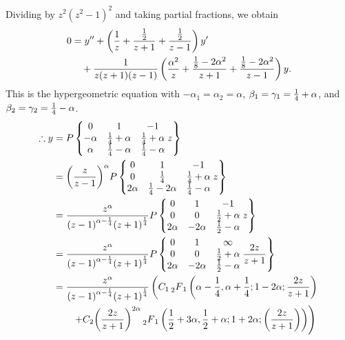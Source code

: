 \item

Dividing by $z^2 {\left( z^2 - 1 \right)}^2$ and taking partial fractions, we obtain
\begin{align*}
    0
    &= y'' + \left(
        \frac{1}{z} + \frac{\frac{1}{2}}{z + 1} + \frac{\frac{1}{2}}{z - 1}
    \right) y' \\
    &\quad + \frac{1}{z (z + 1) (z - 1)} \left(
        \frac{\alpha^2}{z}
        + \frac{\frac{1}{8} - 2\alpha^2}{z + 1}
        + \frac{\frac{1}{8} - 2\alpha^2}{z - 1}
    \right) y.
\end{align*}
This is the hypergeometric equation with $-\alpha_1 = \alpha_2 = \alpha$,
$\beta_1 = \gamma_1 = \frac{1}{4} + \alpha$,
and $\beta_2 = \gamma_2 = \frac{1}{4} - \alpha$.
\begin{align*}
    \therefore y
    &= P\left\{
        \begin{matrix} 0 & 1 & -1 \\ -\alpha & \frac{1}{4} + \alpha & \frac{1}{4} + \alpha \\ \alpha & \frac{1}{4} - \alpha & \frac{1}{4} - \alpha \end{matrix}
    \; z\right\} \\
    &= {\left( \frac{z}{z - 1} \right)}^\alpha P\left\{
        \begin{matrix} 0 & 1 & -1 \\ 0 & \frac{1}{4} & \frac{1}{4} + \alpha \\ 2\alpha & \frac{1}{4} - 2\alpha & \frac{1}{4} - \alpha \end{matrix}
    \; z\right\} \\
    &= \frac{z^\alpha}{{(z - 1)}^{\alpha - \frac{1}{4}} {(z + 1)}^{\frac{1}{4}}} P\left\{
        \begin{matrix} 0 & 1 & -1 \\ 0 & 0 & \frac{1}{2} + \alpha \\ 2\alpha & -2\alpha & \frac{1}{2} - \alpha \end{matrix}
    \; z\right\} \\
    &= \frac{z^\alpha}{{(z - 1)}^{\alpha - \frac{1}{4}} {(z + 1)}^{\frac{1}{4}}} P\left\{
        \begin{matrix} 0 & 1 & \infty \\ 0 & 0 & \frac{1}{2} + \alpha \\ 2\alpha & -2\alpha & \frac{1}{2} - \alpha \end{matrix}
    \; \frac{2z}{z + 1}\right\} \\
    &= \frac{z^\alpha}{{(z - 1)}^{\alpha - \frac{1}{4}} {(z + 1)}^{\frac{1}{4}}} \left(
        C_1 \prescript{}{2}{F}_{1} \left(
            \alpha - \frac{1}{4}, \alpha + \frac{1}{4};
            1 - 2\alpha;
            \frac{2z}{z + 1}
        \right)
    \right. \\
    &\qquad \left.
        + C_2 {\left( \frac{2z}{z + 1} \right)}^{2\alpha} \prescript{}{2}{F}_{1} \left(
            \frac{1}{2} + 3\alpha, \frac{1}{2} + \alpha;
            1 + 2\alpha;
            \left( \frac{2z}{z + 1} \right)
        \right)
    \right)
\end{align*}
